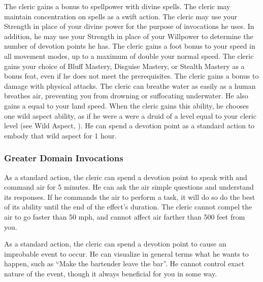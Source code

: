             The cleric gains a  bonus to spellpower with divine spells.
            The cleric may maintain concentration on  spells as a swift action.
            The cleric may use your Strength in place of your divine power for the purpose of invocations he uses.
            In addition, he may use your Strength in place of your Willpower to determine the number of devotion points he has.
            The cleric gains a  foot bonus to your speed in all movement modes, up to a maximum of double your normal speed.
            The cleric gains your choice of Bluff Mastery, Disguise Mastery, or Stealth Mastery as a bonus feat, even if he does not meet the prerequisites.
            The cleric gains a  bonus to damage with physical attacks.
             The cleric can breathe water as easily as a human breathes air, preventing you from drowning or suffocating underwater.
            He also gains a  equal to your land speed.
            When the cleric gains this ability, he chooses one wild aspect ability, as if he were a were a druid of a level equal to your cleric level (see Wild Aspect, ).
            He can spend a devotion point as a standard action to embody that wild aspect for 1 hour.

        \subsubsection{Greater Domain Invocations}\label{Greater Domain Invocations}

            As a standard action, the cleric can spend a devotion point to speak with and command air for 5 minutes.
            He can ask the air simple questions and understand its responses.
            If he commands the air to perform a task, it will do so do the best of its ability until the end of the effect's duration.
            The cleric cannot compel the air to go faster than 50 mph, and cannot affect air farther than 500 feet from you.

            As a standard action, the cleric can spend a devotion point to cause an improbable event to occur.
            He can visualize in general terms what he wants to happen, such as ``Make the bartender leave the bar''.
            He cannot control exact nature of the event, though it always beneficial for you in some way.

